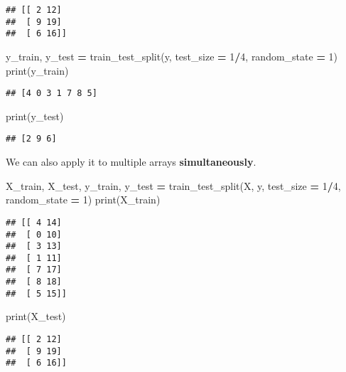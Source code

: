 \documentclass[
]{book}
\newenvironment{Shaded}{\begin{snugshade}}{\end{snugshade}}
\newcommand{\BuiltInTok}[1]{#1}
\newcommand{\DecValTok}[1]{\textcolor[rgb]{0.00,0.00,0.81}{#1}}
\newcommand{\NormalTok}[1]{#1}
\newcommand{\OperatorTok}[1]{\textcolor[rgb]{0.81,0.36,0.00}{\textbf{#1}}}
\begin{document}
\begin{verbatim}
## [[ 2 12]
##  [ 9 19]
##  [ 6 16]]
\end{verbatim}

\begin{Shaded}
\begin{Highlighting}[]
\NormalTok{y\_train, y\_test }\OperatorTok{=}\NormalTok{ train\_test\_split(y, test\_size }\OperatorTok{=} \DecValTok{1}\OperatorTok{/}\DecValTok{4}\NormalTok{, random\_state }\OperatorTok{=} \DecValTok{1}\NormalTok{)}
\BuiltInTok{print}\NormalTok{(y\_train)}
\end{Highlighting}
\end{Shaded}

\begin{verbatim}
## [4 0 3 1 7 8 5]
\end{verbatim}

\begin{Shaded}
\begin{Highlighting}[]
\BuiltInTok{print}\NormalTok{(y\_test)}
\end{Highlighting}
\end{Shaded}

\begin{verbatim}
## [2 9 6]
\end{verbatim}

We can also apply it to multiple arrays \textbf{simultaneously}.

\begin{Shaded}
\begin{Highlighting}[]
\NormalTok{X\_train, X\_test, y\_train, y\_test }\OperatorTok{=}\NormalTok{ train\_test\_split(X, y, test\_size }\OperatorTok{=} \DecValTok{1}\OperatorTok{/}\DecValTok{4}\NormalTok{, random\_state }\OperatorTok{=} \DecValTok{1}\NormalTok{)}
\BuiltInTok{print}\NormalTok{(X\_train)}
\end{Highlighting}
\end{Shaded}

\begin{verbatim}
## [[ 4 14]
##  [ 0 10]
##  [ 3 13]
##  [ 1 11]
##  [ 7 17]
##  [ 8 18]
##  [ 5 15]]
\end{verbatim}

\begin{Shaded}
\begin{Highlighting}[]
\BuiltInTok{print}\NormalTok{(X\_test)}
\end{Highlighting}
\end{Shaded}

\begin{verbatim}
## [[ 2 12]
##  [ 9 19]
##  [ 6 16]]
\end{verbatim}
\end{document}
